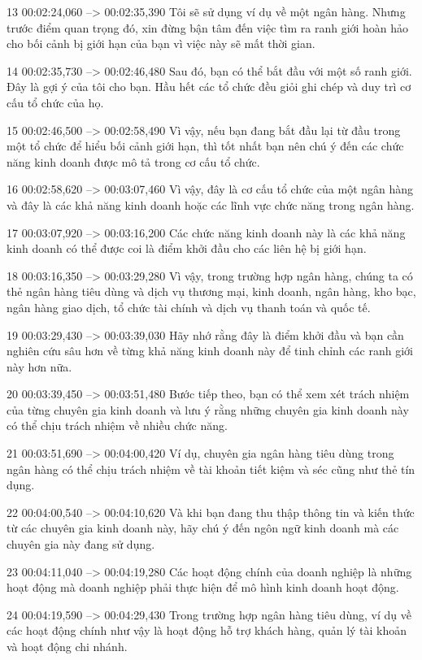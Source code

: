 13
00:02:24,060 --> 00:02:35,390
Tôi sẽ sử dụng ví dụ về một ngân hàng.  Nhưng trước điểm quan trọng đó, xin đừng bận tâm đến việc tìm ra ranh giới hoàn hảo cho bối cảnh bị giới hạn của bạn vì việc này sẽ mất thời gian.

14
00:02:35,730 --> 00:02:46,480
Sau đó, bạn có thể bắt đầu với một số ranh giới.  Đây là gợi ý của tôi cho bạn.  Hầu hết các tổ chức đều giỏi ghi chép và duy trì cơ cấu tổ chức của họ.

15
00:02:46,500 --> 00:02:58,490
Vì vậy, nếu bạn đang bắt đầu lại từ đầu trong một tổ chức để hiểu bối cảnh giới hạn, thì tốt nhất bạn nên chú ý đến các chức năng kinh doanh được mô tả trong cơ cấu tổ chức.

16
00:02:58,620 --> 00:03:07,460
Vì vậy, đây là cơ cấu tổ chức của một ngân hàng và đây là các khả năng kinh doanh hoặc các lĩnh vực chức năng trong ngân hàng.

17
00:03:07,920 --> 00:03:16,200
Các chức năng kinh doanh này là các khả năng kinh doanh có thể được coi là điểm khởi đầu cho các liên hệ bị giới hạn.

18
00:03:16,350 --> 00:03:29,280
Vì vậy, trong trường hợp ngân hàng, chúng ta có thẻ ngân hàng tiêu dùng và dịch vụ thương mại, kinh doanh, ngân hàng, kho bạc, ngân hàng giao dịch, tổ chức tài chính và dịch vụ thanh toán và quốc tế.

19
00:03:29,430 --> 00:03:39,030
Hãy nhớ rằng đây là điểm khởi đầu và bạn cần nghiên cứu sâu hơn về từng khả năng kinh doanh này để tinh chỉnh các ranh giới này hơn nữa.

20
00:03:39,450 --> 00:03:51,480
Bước tiếp theo, bạn có thể xem xét trách nhiệm của từng chuyên gia kinh doanh và lưu ý rằng những chuyên gia kinh doanh này có thể chịu trách nhiệm về nhiều chức năng.

21
00:03:51,690 --> 00:04:00,420
Ví dụ, chuyên gia ngân hàng tiêu dùng trong ngân hàng có thể chịu trách nhiệm về tài khoản tiết kiệm và séc cũng như thẻ tín dụng.

22
00:04:00,540 --> 00:04:10,620
Và khi bạn đang thu thập thông tin và kiến ​​thức từ các chuyên gia kinh doanh này, hãy chú ý đến ngôn ngữ kinh doanh mà các chuyên gia này đang sử dụng.

23
00:04:11,040 --> 00:04:19,280
Các hoạt động chính của doanh nghiệp là những hoạt động mà doanh nghiệp phải thực hiện để mô hình kinh doanh hoạt động.

24
00:04:19,590 --> 00:04:29,430
Trong trường hợp ngân hàng tiêu dùng, ví dụ về các hoạt động chính như vậy là hoạt động hỗ trợ khách hàng, quản lý tài khoản và hoạt động chi nhánh.


